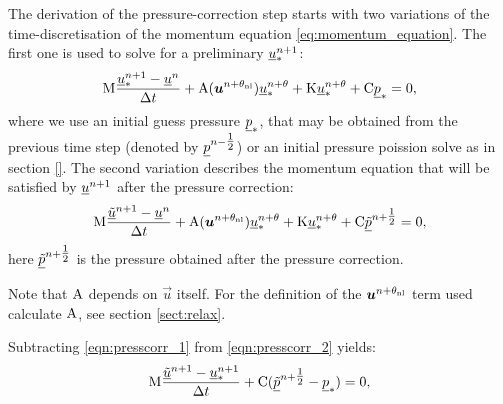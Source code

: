 The derivation of the pressure-correction step starts with two 
variations of the time-discretisation of the 
momentum equation \eqref{eq:momentum_equation}. The first 
one is used to solve for a preliminary $\underline{u}_*^{n+1}$:
\begin{equation}\label{eqn:presscorr_1}
\mathrm{M}  \frac{{\underline{u}_*^{n+1}-\underline{u}^{n}}}{\Delta t}
    +\mathrm{A}({\mbox{\boldmath$u$}}^{n+\theta_{\mathrm{nl}}})\underline{u}_*^{n+\theta}+\mathrm{K}\underline{u}_*^{n+\theta}
    +\mathrm{C} \underline{p}_*
    =0,
\end{equation}
where we use an initial guess pressure $\underline{p}_*$, that may 
be obtained from the previous time step (denoted by 
$\underline{p}^{n-\tfrac 12}$) or an initial
pressure poission solve as in section \ref{}. The second variation
describes the momentum equation that will be satisfied by
$\underline{u}^{n+1}$ after the pressure correction:
\begin{equation}\label{eqn:presscorr_2}
\mathrm{M}  \frac{{\underline{\tilde u}^{n+1}-\underline{u}^{n}}}{\Delta t}
    +\mathrm{A}({\mbox{\boldmath$u$}}^{n+\theta_{\mathrm{nl}}})\underline{u}_*^{n+\theta}+\mathrm{K}\underline{u}_*^{n+\theta}
    +\mathrm{C} \underline{\tilde p}^{n+\tfrac 12}
    =0,
\end{equation}
here $\underline{\tilde p}^{n+\tfrac 12}$ is the pressure 
obtained after the pressure correction.

Note that $\mathrm{A}$ depends on $\vec{u}$ itself. For the definition of the
${\mbox{\boldmath$u$}}^{n+\theta_{\mathrm{nl}}}$ term used calculate $\mathrm{A}$, see section \ref{sect:relax}.

Subtracting \eqref{eqn:presscorr_1} from \eqref{eqn:presscorr_2} yields:
\begin{equation}\label{eqn:presscorr_substract}
\mathrm{M}  \frac{{\underline{\tilde u}^{n+1}-\underline{u}_*^{n+1}}}{\Delta t}
    + \mathrm{C} ( \underline{\tilde p}^{n+\tfrac 12} - \underline{p}_*)
    =0,
\end{equation}


